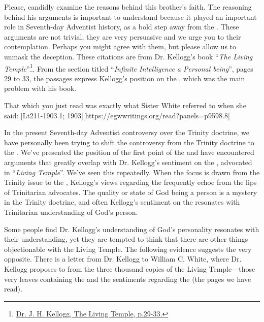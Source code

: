Please, candidly examine the reasons behind this brother’s faith. The reasoning behind his arguments is important to understand because it played an important role in Seventh-day Adventist history, as a bold step away from the . These arguments are not trivial; they are very persuasive and we urge you to their contemplation. Perhaps you might agree with them, but please allow us to unmask the deception. These citations are from Dr. Kellogg’s book “\textit{The Living Temple}”\footnote{\href{https://archive.org/details/J.H.Kellogg.TheLivingTemple1903}{Dr. J. H. Kellogg, The Living Temple, p.29-33.}}. From the section titled “\textit{Infinite Intelligence a Personal being}”, pages 29 to 33, the passages express Kellogg’s position on the , which was the main problem with his book.

That which you just read was exactly what Sister White referred to when she said: [Lt211-1903.1; 1903][https://egwwritings.org/read?panels=p9598.8]

In the present Seventh-day Adventist controversy over the Trinity doctrine, we have personally been trying to shift the controversy from the Trinity doctrine to the . We’ve presented the position of the first point of the  and have encountered arguments that greatly overlap with Dr. Kellogg’s sentiment on the , advocated in “\textit{Living Temple}”. We’ve seen this repeatedly. When the focus is drawn from the Trinity issue to the , Kellogg’s views regarding the  frequently echoe from the lips of Trinitarian advocates. The quality or state of God being a person is a mystery in the Trinity doctrine, and often Kellogg’s sentiment on the  resonates with Trinitarian understanding of God’s person. 

Some people find Dr. Kellogg’s understanding of God’s personality resonates with their understanding, yet they are tempted to think that there are other things objectionable with the Living Temple. The following evidence suggests the very opposite. There is a letter from Dr. Kellogg to William C. White, where Dr. Kellogg proposes to  from the three thousand copies of the Living Temple—those very leaves containing the  and the sentiments regarding the  (the pages we have read).

